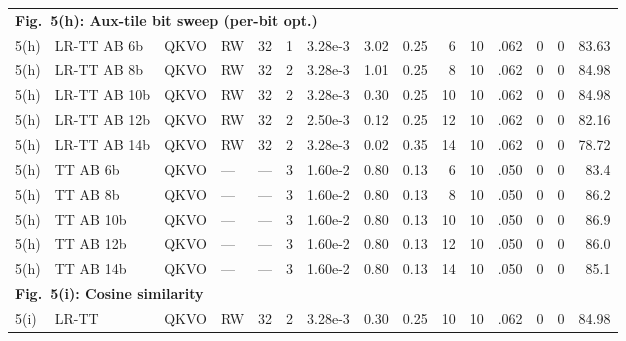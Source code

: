 \documentclass[AMA,LATO1COL]{WileyNJDv5}
\begin{document}
{\begin{longtable}{@{}l l l l r r r r r r r r r r r@{}}
\multicolumn{15}{l}{\cellcolor{HeadGray}\textbf{Fig.~5(h): Aux-tile bit sweep (per-bit opt.)}} \\
5(h) & LR-TT AB 6b & QKVO & RW & 32 & 1 & 3.28e-3 & 3.02 & 0.25 & 6 & 10 & .062 & 0 & 0 & 83.63 \\
5(h) & LR-TT AB 8b & QKVO & RW & 32 & 2 & 3.28e-3 & 1.01 & 0.25 & 8 & 10 & .062 & 0 & 0 & 84.98 \\
5(h) & LR-TT AB 10b & QKVO & RW & 32 & 2 & 3.28e-3 & 0.30 & 0.25 & 10 & 10 & .062 & 0 & 0 & 84.98 \\
5(h) & LR-TT AB 12b & QKVO & RW & 32 & 2 & 2.50e-3 & 0.12 & 0.25 & 12 & 10 & .062 & 0 & 0 & 82.16 \\
5(h) & LR-TT AB 14b & QKVO & RW & 32 & 2 & 3.28e-3 & 0.02 & 0.35 & 14 & 10 & .062 & 0 & 0 & 78.72 \\
5(h) & TT AB 6b & QKVO & --- & --- & 3 & 1.60e-2 & 0.80 & 0.13 & 6 & 10 & .050 & 0 & 0 & 83.4 \\
5(h) & TT AB 8b & QKVO & --- & --- & 3 & 1.60e-2 & 0.80 & 0.13 & 8 & 10 & .050 & 0 & 0 & 86.2 \\
5(h) & TT AB 10b & QKVO & --- & --- & 3 & 1.60e-2 & 0.80 & 0.13 & 10 & 10 & .050 & 0 & 0 & 86.9 \\
5(h) & TT AB 12b & QKVO & --- & --- & 3 & 1.60e-2 & 0.80 & 0.13 & 12 & 10 & .050 & 0 & 0 & 86.0 \\
5(h) & TT AB 14b & QKVO & --- & --- & 3 & 1.60e-2 & 0.80 & 0.13 & 14 & 10 & .050 & 0 & 0 & 85.1 \\
\midrule

\multicolumn{15}{l}{\cellcolor{HeadGray}\textbf{Fig.~5(i): Cosine similarity}} \\
5(i) & LR-TT & QKVO & RW & 32 & 2 & 3.28e-3 & 0.30 & 0.25 & 10 & 10 & .062 & 0 & 0 & 84.98 \\
\midrule


\end{longtable}}
\end{document}
